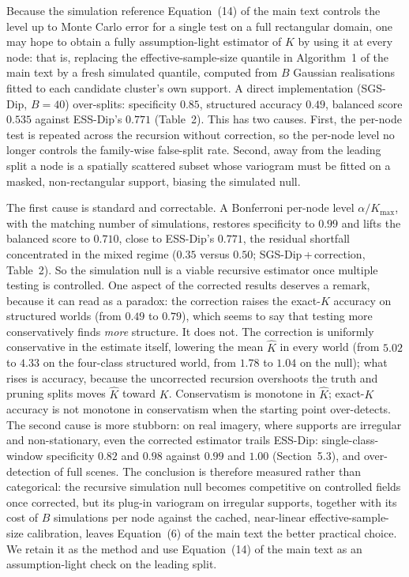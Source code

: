 \documentclass[11pt]{article}
\begin{document}
Because the simulation reference Equation~(14) of the main text controls the
level up to Monte Carlo error for a single test on a full rectangular domain, one may hope to
obtain a fully assumption-light estimator of $K$ by using it at every node:
that is, replacing the effective-sample-size quantile in
Algorithm~1 of the main text by a fresh simulated quantile, computed from $B$
Gaussian realisations fitted to each candidate cluster's own support. A direct
implementation (SGS-Dip, $B=40$) over-splits: specificity $0.85$, structured
accuracy $0.49$, balanced score $0.535$ against ESS-Dip's $0.771$
(Table~2). This has two causes. First, the per-node test is
repeated across the recursion without correction, so the per-node level no
longer controls the family-wise false-split rate. Second, away from the leading
split a node is a spatially scattered subset whose variogram must be fitted on a
masked, non-rectangular support, biasing the simulated null.

The first cause is standard and correctable. A Bonferroni per-node level
$\alpha/K_{\max}$, with the matching number of simulations, restores specificity
to $0.99$ and lifts the balanced score to $0.710$, close to ESS-Dip's
$0.771$, the residual shortfall concentrated in the mixed regime
($0.35$ versus $0.50$; SGS-Dip\,+\,correction, Table~2). So the
simulation null is a viable recursive estimator once multiple testing is
controlled. One aspect of the corrected results deserves a remark,
because it can read as a paradox: the correction raises the exact-$K$
accuracy on structured worlds (from $0.49$ to $0.79$), which seems to say
that testing more conservatively finds \emph{more} structure. It does not.
The correction is uniformly conservative in the estimate itself, lowering the
mean $\hat K$ in every world (from $5.02$ to $4.33$ on the four-class
structured world, from $1.78$ to $1.04$ on the null); what rises is accuracy,
because the uncorrected recursion overshoots the truth and pruning splits
moves $\hat K$ toward $K$. Conservatism is monotone in $\hat K$; exact-$K$
accuracy is not monotone in conservatism when the starting point over-detects. The second cause is more stubborn: on real imagery, where supports
are irregular and non-stationary, even the corrected estimator trails ESS-Dip:
single-class-window specificity $0.82$ and $0.98$ against $0.99$ and $1.00$
(Section~5.3), and over-detection of full scenes. The
conclusion is therefore measured rather than categorical: the recursive
simulation null becomes competitive on controlled fields once corrected, but its
plug-in variogram on irregular supports, together with its cost of $B$
simulations per node against the cached, near-linear effective-sample-size
calibration, leaves Equation~(6) of the main text the better practical choice. We retain it as
the method and use Equation~(14) of the main text as an assumption-light check on the
leading split.




\end{document}
